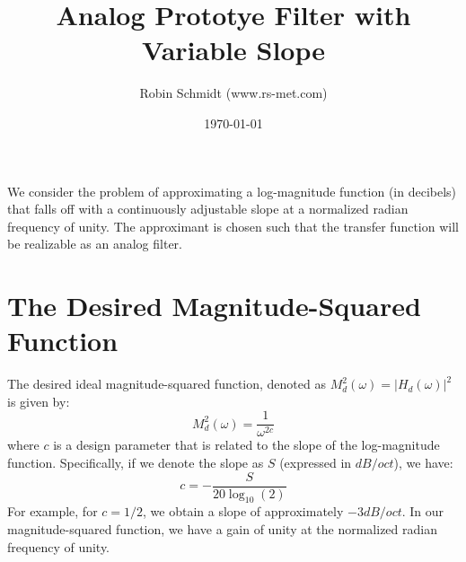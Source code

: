 \title{Analog Prototye Filter with Variable Slope}
\author{Robin Schmidt (www.rs-met.com)}
\date{\today}
\maketitle

We consider the problem of approximating a log-magnitude function (in decibels) that falls off with a continuously adjustable slope at a normalized radian frequency of unity. The approximant is chosen such that the transfer function will be realizable as an analog filter.

\section{The Desired Magnitude-Squared Function}
The desired ideal magnitude-squared function, denoted as $M_d^2(\omega) = |H_d(\omega)|^2$ is given by:
\begin{equation}
M^2_d(\omega) = \frac{1}{\omega^{2c}}
\end{equation}
where $c$ is a design parameter that is related to the slope of the log-magnitude function. Specifically, if we denote the slope as $S$ (expressed in $dB/oct$), we have:
\begin{equation}
 c = -\frac{S}{20 \log_{10}(2)}
\end{equation}
For example, for $c = 1/2$, we obtain a slope of approximately $-3 dB/oct$. In our magnitude-squared function, we have a gain of unity at the normalized radian frequency of unity.

